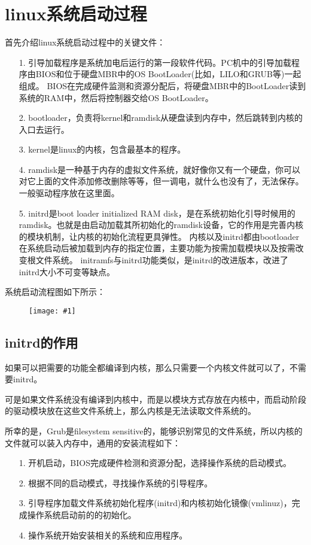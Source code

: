 \documentclass[a4paper,left=2.5cm,right=2.5cm,11pt]{article}
\newcommand{\fic}[1]{\begin{figure}[H]
		\center
		\texttt{[image: \#1]}
	\end{figure}}
\begin{document}
\tableofcontents

\clearpage

\section{linux系统启动过程}
	首先介绍linux系统启动过程中的关键文件：
	\begin{itemize}
		\item[1.] 引导加载程序是系统加电后运行的第一段软件代码。PC机中的引导加载程序由BIOS和位于硬盘MBR中的OS BootLoader(比如，LILO和GRUB等)一起组成。
				  BIOS在完成硬件监测和资源分配后，将硬盘MBR中的BootLoader读到系统的RAM中，然后将控制器交给OS BootLoader。
		\item[2.] bootloader，负责将kernel和ramdisk从硬盘读到内存中，然后跳转到内核的入口去运行。
		\item[3.] kernel是linux的内核，包含最基本的程序。
		\item[4.] ramdisk是一种基于内存的虚拟文件系统，就好像你又有一个硬盘，你可以对它上面的文件添加修改删除等等，但一调电，就什么也没有了，无法保存。一般驱动程序放在这里面。
		\item[5.] initrd是boot loader initialized RAM disk，是在系统初始化引导时候用的ramdisk。也就是由启动加载其所初始化的ramdisk设备，它的作用是完善内核的模块机制，让内核的初始化流程更具弹性。
				  内核以及initrd都由bootloader在系统启动后被加载到内存的指定位置，主要功能为按需加载模块以及按需改变根文件系统。
				  initramfs与initrd功能类似，是initrd的改进版本，改进了initrd大小不可变等缺点。
	\end{itemize}

	系统启动流程图如下所示：
	\fic{1.PNG}

\subsection{initrd的作用}
	如果可以把需要的功能全都编译到内核，那么只需要一个内核文件就可以了，不需要initrd。\par

	可是如果文件系统没有编译到内核中，而是以模块方式存放在内核中，而启动阶段的驱动模块放在这些文件系统上，那么内核是无法读取文件系统的。\par

	所幸的是，Grub是filesystem sensitive的，能够识别常见的文件系统，所以内核的文件就可以装入内存中，通用的安装流程如下：
	\begin{itemize}
		\item[1.] 开机启动，BIOS完成硬件检测和资源分配，选择操作系统的启动模式。
		\item[2.] 根据不同的启动模式，寻找操作系统的引导程序。
		\item[3.] 引导程序加载文件系统初始化程序(initrd)和内核初始化镜像(vmlinuz)，完成操作系统启动前的的初始化。
		\item[4.] 操作系统开始安装相关的系统和应用程序。
	\end{itemize}
\end{document}
